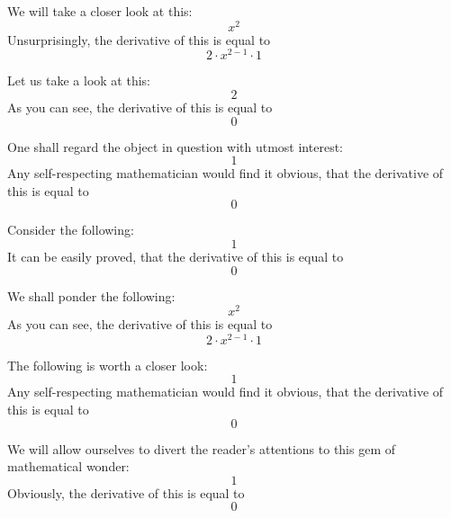 \documentclass{article}
\begin{document}
We will take a closer look at this:
\begin{equation}
x ^{2 } 
\end{equation}
Unsurprisingly, the derivative of this is equal to
\begin{equation}
2 \cdot x ^{2 - 1 } \cdot 1 
\end{equation}

Let us take a look at this:
\begin{equation}
2 
\end{equation}
As you can see, the derivative of this is equal to
\begin{equation}
0 
\end{equation}

One shall regard the object in question with utmost interest:
\begin{equation}
1 
\end{equation}
Any self-respecting mathematician would find it obvious, that the derivative of this is equal to
\begin{equation}
0 
\end{equation}

Consider the following:
\begin{equation}
1 
\end{equation}
It can be easily proved, that the derivative of this is equal to
\begin{equation}
0 
\end{equation}

We shall ponder the following:
\begin{equation}
x ^{2 } 
\end{equation}
As you can see, the derivative of this is equal to
\begin{equation}
2 \cdot x ^{2 - 1 } \cdot 1 
\end{equation}

The following is worth a closer look:
\begin{equation}
1 
\end{equation}
Any self-respecting mathematician would find it obvious, that the derivative of this is equal to
\begin{equation}
0 
\end{equation}

We will allow ourselves to divert the reader's attentions to this gem of mathematical wonder:
\begin{equation}
1 
\end{equation}
Obviously, the derivative of this is equal to
\begin{equation}
0 
\end{equation}
\end{document}
